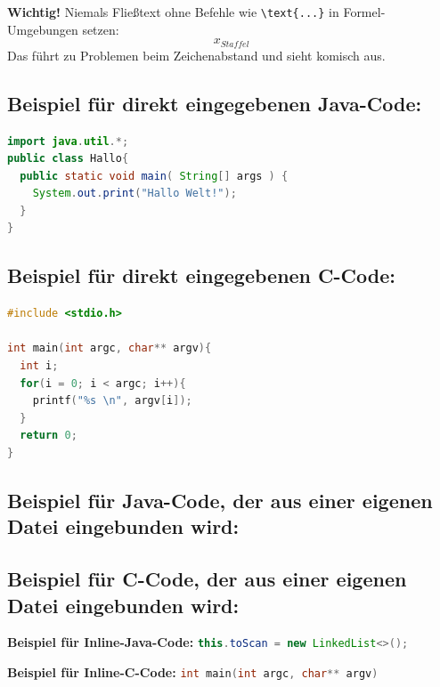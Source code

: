 \textbf{Wichtig!} Niemals Fließtext ohne Befehle wie \texttt{\textbackslash text\{...\}} in Formel-Umgebungen setzen:
\[
  x_{Staffel}
\]
Das führt zu Problemen beim Zeichenabstand und sieht komisch aus.


\subsection*{Beispiel für direkt eingegebenen Java-Code:}

\begin{lstlisting}[language=java]
import java.util.*;
public class Hallo{
  public static void main( String[] args ) {
    System.out.print("Hallo Welt!");
  }
}
\end{lstlisting}


\subsection*{Beispiel für direkt eingegebenen C-Code:}

\begin{lstlisting}[language=c]
#include <stdio.h>

int main(int argc, char** argv){
  int i;
  for(i = 0; i < argc; i++){
    printf("%s \n", argv[i]);
  }
  return 0;
}
\end{lstlisting}


\subsection*{Beispiel für Java-Code, der aus einer eigenen Datei eingebunden wird:}



\subsection*{Beispiel für C-Code, der aus einer eigenen Datei eingebunden wird:}




\textbf{Beispiel für Inline-Java-Code:} \lstinline[language=java]|this.toScan = new LinkedList<>();|

\textbf{Beispiel für Inline-C-Code:} \lstinline[language=c]|int main(int argc, char** argv)|

